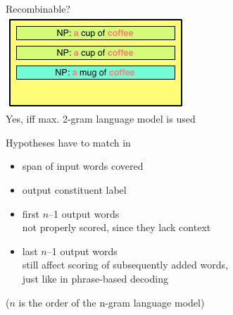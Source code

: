 \documentclass[landscape]{slides}
\begin{document}

\begin{center} \vspace{10mm}
Recombinable?\\[10mm]
\includegraphics[scale=3]{chart-recombination4.pdf}\\[10mm]
Yes, iff max. 2-gram language model is used
\end{center}


\vspace{10mm}
Hypotheses have to match in
\begin{itemize} \itemsep -2mm
\item span of input words covered
\item output constituent label
\item first $n$--1 output words\\
\phantom{x} \hfill not properly scored, since they lack context
\item last $n$--1 output words\\
\phantom{x} \hfill still affect scoring of subsequently added words,\\ 
\phantom{x} \hfill just like in phrase-based decoding
\end{itemize}
\vspace{10mm}
\begin{center}
{\small ($n$ is the order of the n-gram language model)}
\end{center}

\end{document}
